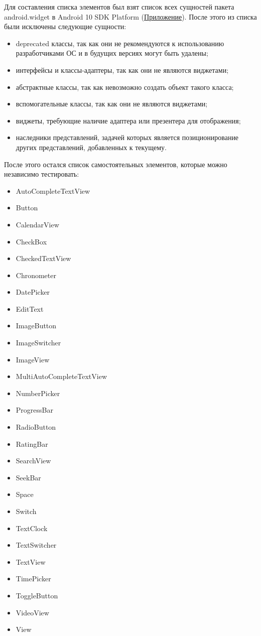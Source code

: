 \documentclass[a4paper,14pt]{extarticle} %
\begin{document}
	Для составления списка элементов был взят список всех сущностей пакета android.widget в Android 10 SDK Platform (\hyperref[appendix]{Приложение}). После этого из списка были исключены следующие сущности:
	\begin{itemize}
		\item deprecated классы, так как они не рекомендуются к использованию разработчиками ОС и в будущих версиях могут быть удалены;
		\item интерфейсы и классы-адаптеры, так как они не являются виджетами;
		\item абстрактные классы, так как невозможно создать объект такого класса;
		\item вспомогательные классы, так как они не являются виджетами;
		\item виджеты, требующие наличие адаптера или презентера для отображения;
		\item наследники представлений, задачей которых является позиционирование других представлений, добавленных к текущему.
	\end{itemize}
	
	После этого остался список самостоятельных элементов, которые можно независимо тестировать:
	\begin{itemize}
		\item AutoCompleteTextView
		\item Button
		\item CalendarView
		\item CheckBox
		 \item CheckedTextView
		 \item Chronometer
		 \item DatePicker
		 \item EditText
		 \item ImageButton
		 \item ImageSwitcher
		 \item ImageView
		 \item MultiAutoCompleteTextView
		 \item NumberPicker
		 \item ProgressBar 
		 \item RadioButton
		 \item RatingBar
		 \item SearchView
		 \item SeekBar
		 \item Space
		 \item Switch
		 \item TextClock
		 \item TextSwitcher
		 \item TextView
		 \item TimePicker
		 \item ToggleButton
		 \item VideoView
		 \item View
		
	\end{itemize}
	
\end{document}
